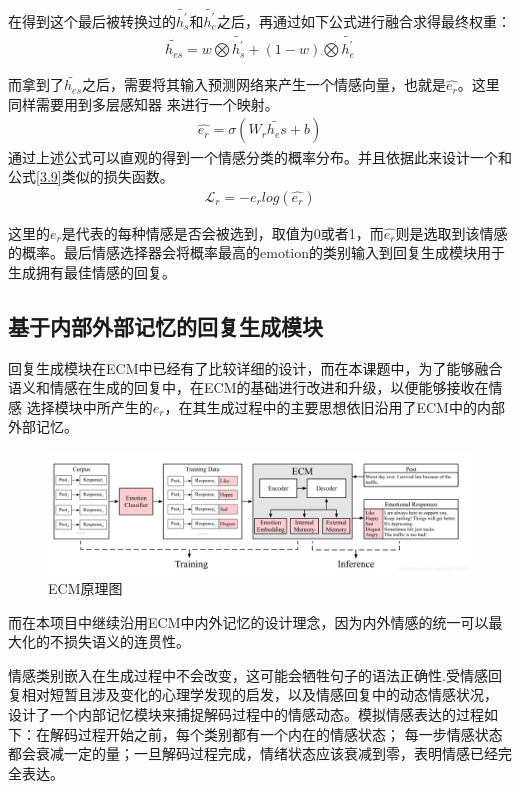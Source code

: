 \documentclass[supercite]{HustGraduPaper}
\theoremstyle{definition}
\begin{document}
在得到这个最后被转换过的$\widetilde{h_s^{'}}$和$\widetilde{h_e^{'}}$之后，再通过如下公式进行融合求得最终权重：
\begin{align}
  {\widetilde{h_{es}}} = w \bigotimes {\widetilde{h_s^{'}}} + (1 - w) \bigotimes {\widetilde{h_e^{'}}} \label{3.13}
\end{align}

而拿到了$\widetilde{h_{es}}$之后，需要将其输入预测网络来产生一个情感向量，也就是$\hat{e_r}$。这里同样需要用到多层感知器
来进行一个映射。
\begin{align}
  \hat{e_r} = \sigma(W_r \widetilde{h_es} + b) \label{3.14}
\end{align}
通过上述公式可以直观的得到一个情感分类的概率分布。并且依据此来设计一个和公式\ref{3.9}类似的损失函数。
\begin{align}
  \mathcal{L}_r = -e_r log(\hat{e_r}) \label{3.15} 
\end{align}

这里的$e_r$是代表的每种情感是否会被选到，取值为0或者1，而$\hat{e_r}$则是选取到该情感的概率。最后情感选择器会将概率最高的emotion的类别输入到回复生成模块用于生成拥有最佳情感的回复。

\subsection{基于内部外部记忆的回复生成模块}
回复生成模块在ECM\cite{DBLP:journals/corr/ZhouHZZL17}中已经有了比较详细的设计，而在本课题中，为了能够融合语义和情感在生成的回复中，在ECM的基础进行改进和升级，以便能够接收在情感
选择模块中所产生的$e_r$，在其生成过程中的主要思想依旧沿用了ECM中的内部外部记忆。
\begin{figure}[htbp] %
  \centering %
  \includegraphics[width=1\textwidth]{images/ECM.png} %
  \caption{ECM原理图} %
  \label{Fig.ECM} %
\end{figure}
而在本项目中继续沿用ECM中内外记忆的设计理念，因为内外情感的统一可以最大化的不损失语义的连贯性。

情感类别嵌入在生成过程中不会改变，这可能会牺牲句子的语法正确性.受情感回复相对短暂且涉及变化的心理学发现的启发，以及情感回复中的动态情感状况，
设计了一个内部记忆模块来捕捉解码过程中的情感动态。模拟情感表达的过程如下：在解码过程开始之前，每个类别都有一个内在的情感状态；
每一步情感状态都会衰减一定的量；一旦解码过程完成，情绪状态应该衰减到零，表明情感已经完全表达。
\end{document}
